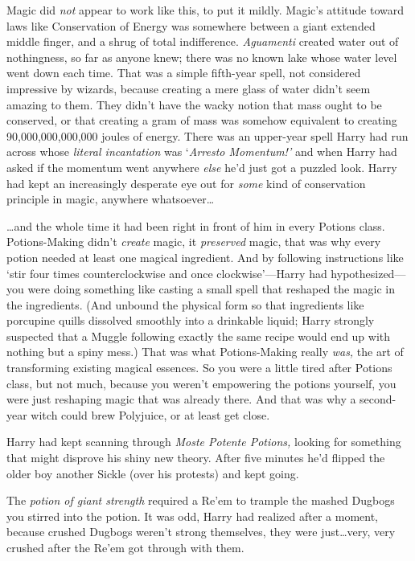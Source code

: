 Magic did \emph{not} appear to work like this, to put it mildly. Magic’s attitude toward laws like Conservation of Energy was somewhere between a giant extended middle finger, and a shrug of total indifference. \emph{Aguamenti} created water out of nothingness, so far as anyone knew; there was no known lake whose water level went down each time. That was a simple fifth-year spell, not considered impressive by wizards, because creating a mere glass of water didn’t seem amazing to them. They didn’t have the wacky notion that mass ought to be conserved, or that creating a gram of mass was somehow equivalent to creating 90,000,000,000,000 joules of energy. There was an upper-year spell Harry had run across whose \emph{literal incantation} was ‘\emph{Arresto Momentum!’} and when Harry had asked if the momentum went anywhere \emph{else} he’d just got a puzzled look. Harry had kept an increasingly desperate eye out for \emph{some} kind of conservation principle in magic, anywhere whatsoever…

…and the whole time it had been right in front of him in every Potions class. Potions-Making didn’t \emph{create} magic, it \emph{preserved} magic, that was why every potion needed at least one magical ingredient. And by following instructions like ‘stir four times counterclockwise and once clockwise’—Harry had hypothesized—you were doing something like casting a small spell that reshaped the magic in the ingredients. (And unbound the physical form so that ingredients like porcupine quills dissolved smoothly into a drinkable liquid; Harry strongly suspected that a Muggle following exactly the same recipe would end up with nothing but a spiny mess.) That was what Potions-Making really \emph{was,} the art of transforming existing magical essences. So you were a little tired after Potions class, but not much, because you weren’t empowering the potions yourself, you were just reshaping magic that was already there. And that was why a second-year witch could brew Polyjuice, or at least get close.

Harry had kept scanning through \emph{Moste Potente Potions,} looking for something that might disprove his shiny new theory. After five minutes he’d flipped the older boy another Sickle (over his protests) and kept going.

The \emph{potion of giant strength} required a Re’em to trample the mashed Dugbogs you stirred into the potion. It was odd, Harry had realized after a moment, because crushed Dugbogs weren’t strong themselves, they were just…very, very crushed after the Re’em got through with them.

